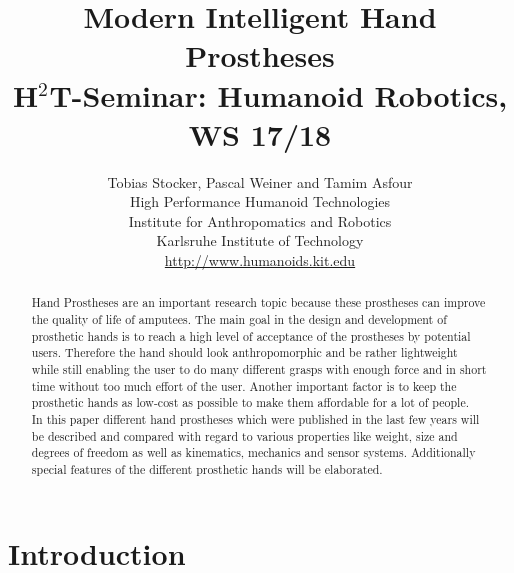 \documentclass[a4paper, 10pt, conference]{ieeeconf}      %
\title{\bf {\LARGE Modern Intelligent Hand Prostheses} \\ 
{\normalsize H$^2$T-Seminar: Humanoid Robotics, WS 17/18}}
\author{Tobias Stocker, Pascal Weiner and Tamim Asfour \\ High Performance Humanoid Technologies \\ Institute for Anthropomatics and Robotics \\ Karlsruhe Institute of Technology \\
\url{http://www.humanoids.kit.edu}}
\begin{document}
\maketitle
\thispagestyle{empty}
\pagestyle{empty}
%
\begin{abstract}
Hand Prostheses are an important research topic because these prostheses can improve the quality of life of amputees. The main goal in the design and development of prosthetic hands is to reach a high level of acceptance of the prostheses by potential users. Therefore the hand should look anthropomorphic and be rather lightweight while still enabling the user to do many different grasps with enough force and in short time without too much effort of the user. Another important factor is to keep the prosthetic hands as low-cost as possible to make them affordable for a lot of people.\\
In this paper different hand prostheses which were published in the last few years will be described and compared with regard to various properties like weight, size and degrees of freedom as well as kinematics, mechanics and sensor systems. Additionally special features of the different prosthetic hands will be elaborated.
\end{abstract}

\section{Introduction}
\end{document}
